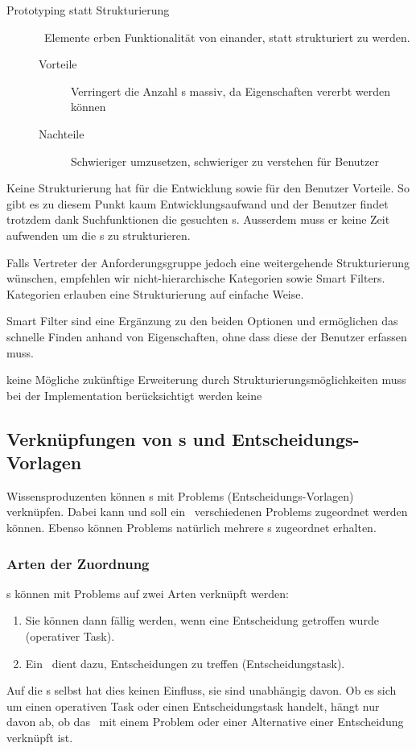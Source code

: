{{\begin{description}
					\item[Prototyping statt Strukturierung] \
						Elemente erben Funktionalität von einander, statt strukturiert zu werden.
						\begin{description}
							\item[Vorteile] Verringert die Anzahl \ttpl s massiv, 
								da Eigenschaften vererbt werden können
							\item[Nachteile] Schwieriger umzusetzen, schwieriger zu verstehen für Benutzer
						\end{description}					
				\end{description}
			}
			{
				Keine Strukturierung hat für die Entwicklung sowie für den Benutzer Vorteile.
				So gibt es zu diesem Punkt kaum Entwicklungsaufwand 
				und der Benutzer findet trotzdem dank Suchfunktionen die gesuchten \ttpl s.
				Ausserdem muss er keine Zeit aufwenden um die \ttpl s zu strukturieren.

				Falls Vertreter der Anforderungsgruppe jedoch eine weitergehende Strukturierung wünschen, 
				empfehlen wir nicht-hierarchische Kategorien sowie Smart Filters.
				Kategorien erlauben eine Strukturierung auf einfache Weise. 

				Smart Filter sind eine Ergänzung zu den beiden Optionen und ermöglichen das schnelle Finden anhand von Eigenschaften,
				ohne dass diese der Benutzer erfassen muss.
			}
			{keine}
			{Mögliche zukünftige Erweiterung durch Strukturierungsmöglichkeiten muss bei der Implementation berücksichtigt werden}
			{keine}
		}
		
		
		\subsection{Verknüpfungen von \ttpl s und Entscheidungs-Vorlagen}
			Wissensproduzenten können \ttpl s mit Problems (Entscheidungs-Vorlagen) verknüpfen.
			Dabei kann und soll ein \ttpl\ verschiedenen Problems zugeordnet werden können.
			Ebenso können Problems natürlich mehrere \ttpl s zugeordnet erhalten.
			
			\subsubsection{Arten der Zuordnung}
				\ttpl s können mit Problems auf zwei Arten verknüpft werden:
				\begin{enumerate}
					\item Sie können dann fällig werden, wenn eine Entscheidung getroffen wurde (operativer Task).
					\item Ein \ttpl\ dient dazu, Entscheidungen zu treffen (Entscheidungstask).
				\end{enumerate}
				Auf die \ttpl s selbst hat dies keinen Einfluss, sie sind unabhängig davon. 
				Ob es sich um einen operativen Task oder einen Entscheidungstask handelt, hängt nur davon ab,
				ob das \ttpl\ mit einem Problem oder einer Alternative einer Entscheidung verknüpft ist.
				
